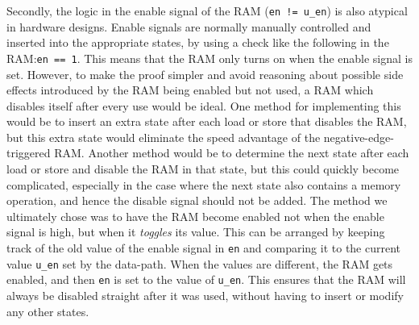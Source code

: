Secondly, the logic in the enable signal of the RAM (\texttt{en != u\_en}) is
also atypical in hardware designs.  Enable signals are normally manually
controlled and inserted into the appropriate states, by using a check like the
following in the RAM:\@ \texttt{en == 1}.  This means that the RAM only turns on
when the enable signal is set.  However, to make the proof simpler and avoid
reasoning about possible side effects introduced by the RAM being enabled but
not used, a RAM which disables itself after every use would be ideal.  One
method for implementing this would be to insert an extra state after each load
or store that disables the RAM, but this extra state would eliminate the speed
advantage of the negative-edge-triggered RAM. Another method would be to
determine the next state after each load or store and disable the RAM in that
state, but this could quickly become complicated, especially in the case where
the next state also contains a memory operation, and hence the disable signal
should not be added. The method we ultimately chose was to have the RAM become
enabled not when the enable signal is high, but when it \emph{toggles} its
value.  This can be arranged by keeping track of the old value of the enable
signal in \texttt{en} and comparing it to the current value \texttt{u\_en} set
by the data-path.  When the values are different, the RAM gets enabled, and then
\texttt{en} is set to the value of \texttt{u\_en}. This ensures that the RAM
will always be disabled straight after it was used, without having to insert or
modify any other states.


